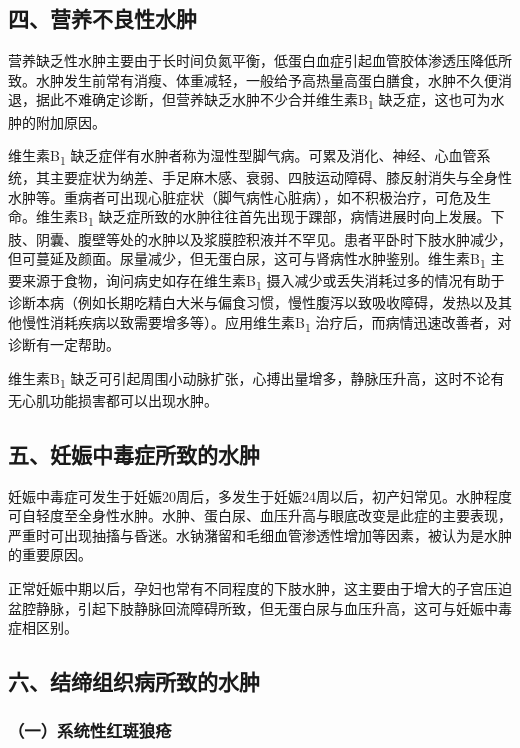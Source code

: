 \subsection{四、营养不良性水肿}

营养缺乏性水肿主要由于长时间负氮平衡，低蛋白血症引起血管胶体渗透压降低所致。水肿发生前常有消瘦、体重减轻，一般给予高热量高蛋白膳食，水肿不久便消退，据此不难确定诊断，但营养缺乏水肿不少合并维生素B\textsubscript{1}
缺乏症，这也可为水肿的附加原因。

维生素B\textsubscript{1}
缺乏症伴有水肿者称为湿性型脚气病。可累及消化、神经、心血管系统，其主要症状为纳差、手足麻木感、衰弱、四肢运动障碍、膝反射消失与全身性水肿等。重病者可出现心脏症状（脚气病性心脏病），如不积极治疗，可危及生命。维生素B\textsubscript{1}
缺乏症所致的水肿往往首先出现于踝部，病情进展时向上发展。下肢、阴囊、腹壁等处的水肿以及浆膜腔积液并不罕见。患者平卧时下肢水肿减少，但可蔓延及颜面。尿量减少，但无蛋白尿，这可与肾病性水肿鉴别。维生素B\textsubscript{1}
主要来源于食物，询问病史如存在维生素B\textsubscript{1}
摄入减少或丢失消耗过多的情况有助于诊断本病（例如长期吃精白大米与偏食习惯，慢性腹泻以致吸收障碍，发热以及其他慢性消耗疾病以致需要增多等）。应用维生素B\textsubscript{1}
治疗后，而病情迅速改善者，对诊断有一定帮助。

维生素B\textsubscript{1}
缺乏可引起周围小动脉扩张，心搏出量增多，静脉压升高，这时不论有无心肌功能损害都可以出现水肿。

\subsection{五、妊娠中毒症所致的水肿}

妊娠中毒症可发生于妊娠20周后，多发生于妊娠24周以后，初产妇常见。水肿程度可自轻度至全身性水肿。水肿、蛋白尿、血压升高与眼底改变是此症的主要表现，严重时可出现抽搐与昏迷。水钠潴留和毛细血管渗透性增加等因素，被认为是水肿的重要原因。

正常妊娠中期以后，孕妇也常有不同程度的下肢水肿，这主要由于增大的子宫压迫盆腔静脉，引起下肢静脉回流障碍所致，但无蛋白尿与血压升高，这可与妊娠中毒症相区别。

\subsection{六、结缔组织病所致的水肿}

\subsubsection{（一）系统性红斑狼疮}

